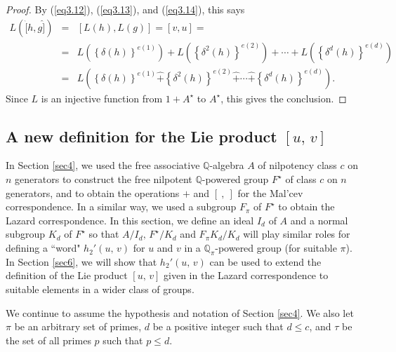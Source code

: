 \documentclass[mathscr]{amsart}
\theoremstyle{theorem}
\theoremstyle{definition}
\numberwithin{equation}{section}
\def \({\left(}
\def \){\right)}
\begin{document}
\begin{proof}
By (\ref{eq3.12}), (\ref{eq3.13}), and (\ref{eq3.14}), this says
\begin{eqnarray*}
L\(\hat[h,g\hat]\)&=&\left[L(h),L(g)\right]=[v,u]=\\
&=&
L\(\left\{\delta(h)\right\}^{e(1)}\)+L\(\left\{\delta^2(h)\right\}^{e(2)}\)+
\cdots+ L\(\left\{\delta^d(h)\right\}^{e(d)}\)\\
&=& L\(\left\{\delta(h)\right\}^{e(1)}\hat +
\left\{\delta^2(h)\right\}^{e(2)}\hat +\cdots \hat +
\left\{\delta^d(h)\right\}^{e(d)}\).
\end{eqnarray*}
Since $L$ is an injective function from $1+A^\star$ to $A^\star$,
this gives the conclusion.
\end{proof}

\begin{center}
\section{A new definition for the Lie product $[u,\,v]$}
\label{sec5-3-28-07}
\end{center}

In Section \ref{sec4}, we used the free associative
$\mathbb{Q}$-algebra $A$ of nilpotency class $c$ on $n$ generators
to construct the free nilpotent $\mathbb{Q}$-powered group $F^\star$
of class $c$ on $n$ generators, and to obtain the operations $+$ and
$[\ ,\ ]$ for the Mal'cev correspondence. In a similar way, we used
a subgroup $F_\pi$ of $F^\star$ to obtain the Lazard correspondence.
In this section, we define an ideal $I_d$ of $A$ and a normal
subgroup $K_d$ of $F^\star$ so that $A/I_d,\, F^\star/K_d$ and
$F_\pi K_d/K_d$ will play similar roles for defining %
a ``word" $h_2'(u,\,v)$ for $u$ and $v$ in a
$\mathbb{Q}_\pi$-powered group (for suitable $\pi$). In Section
\ref{sec6}, we will show that $h_2'(u,\,v)$ can be used to extend
the definition of the Lie product $[u,\,v]$ given in the Lazard
correspondence to suitable elements in a wider class of groups.

We continue to assume the hypothesis and notation of Section
\ref{sec4}. %
We also let $\pi$ be an
arbitrary set of primes, $d$ be a positive integer such that $d\leq
c$, and $\tau$ be the set of all primes $p$ such that $p\leq d$.
\end{document}
